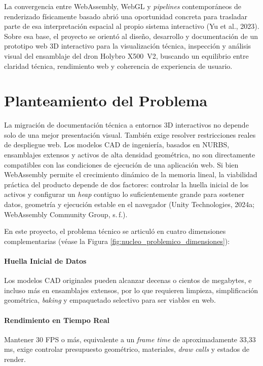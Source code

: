 La convergencia entre WebAssembly, WebGL y \textit{pipelines} contemporáneos de renderizado físicamente basado abrió una oportunidad concreta para trasladar parte de esa interpretación espacial al propio sistema interactivo (Yu et al., 2023). Sobre esa base, el proyecto se orientó al diseño, desarrollo y documentación de un prototipo web 3D interactivo para la visualización técnica, inspección y análisis visual del ensamblaje del dron Holybro X500~V2, buscando un equilibrio entre claridad técnica, rendimiento web y coherencia de experiencia de usuario.

\section{Planteamiento del Problema}

La migración de documentación técnica a entornos 3D interactivos no depende solo de una mejor presentación visual. También exige resolver restricciones reales de despliegue web. Los modelos CAD de ingeniería, basados en NURBS, ensamblajes extensos y activos de alta densidad geométrica, no son directamente compatibles con las condiciones de ejecución de una aplicación web. Si bien WebAssembly permite el crecimiento dinámico de la memoria lineal, la viabilidad práctica del producto depende de dos factores: controlar la huella inicial de los activos y configurar un \textit{heap} contiguo lo suficientemente grande para sostener datos, geometría y ejecución estable en el navegador (Unity Technologies, 2024a; WebAssembly Community Group, s.\,f.).

En este proyecto, el problema técnico se articuló en cuatro dimensiones complementarias (véase la Figura \ref{fig:nucleo_problemico_dimensiones}):

\paragraph{Huella Inicial de Datos} Los modelos CAD originales pueden alcanzar decenas o cientos de megabytes, e incluso más en ensamblajes extensos, por lo que requieren limpieza, simplificación geométrica, \textit{baking} y empaquetado selectivo para ser viables en web.

\paragraph{Rendimiento en Tiempo Real} Mantener 30 FPS o más, equivalente a un \textit{frame time} de aproximadamente 33,33\,ms, exige controlar presupuesto geométrico, materiales, \textit{draw calls} y estados de render.

